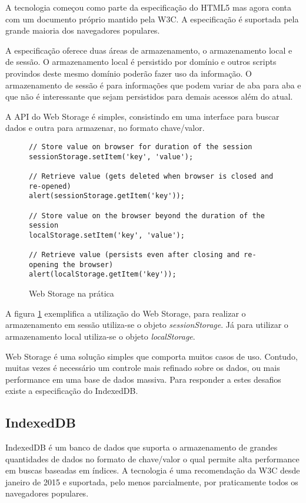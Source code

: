 A tecnologia começou como parte da especificação do HTML5 mas agora
conta com um documento próprio mantido pela W3C. A especificação é
suportada pela grande maioria dos navegadores populares.

A especificação oferece duas áreas de armazenamento, o armazenamento
local e de sessão. O armazenamento local é persistido por domínio
e outros scripts provindos deste mesmo domínio poderão fazer uso da
informação. O armazenamento de sessão é para informações que podem
variar de aba para aba e que não é interessante que sejam persistidos
para demais acessos além do atual.

A API do Web Storage é simples, consistindo em uma interface para
buscar dados e outra para armazenar, no formato chave/valor.

\begin{figure}[H]
\centering
\begin{verbatim}
// Store value on browser for duration of the session
sessionStorage.setItem('key', 'value');

// Retrieve value (gets deleted when browser is closed and re-opened)
alert(sessionStorage.getItem('key'));

// Store value on the browser beyond the duration of the session
localStorage.setItem('key', 'value');

// Retrieve value (persists even after closing and re-opening the browser)
alert(localStorage.getItem('key'));

\end{verbatim}
\caption{Web Storage na prática}
\label{fig:WebStorage}
\end{figure}

A figura \ref{fig:WebStorage} exemplifica a utilização do Web
Storage, para realizar o armazenamento em sessão utiliza-se o objeto
\textit{sessionStorage}. Já para utilizar o armazenamento local
utiliza-se o objeto \textit{localStorage}.

Web Storage é uma solução simples que comporta muitos casos de uso.
Contudo, muitas vezes é necessário um controle mais refinado
sobre os dados, ou mais performance em uma base de dados massiva. Para
responder a estes desafios existe a especificação do IndexedDB.

\subsection{IndexedDB}
IndexedDB é um banco de dados que suporta o armazenamento de grandes
quantidades de dados no formato de chave/valor o qual  permite alta
performance em buscas baseadas em índices. A tecnologia é uma recomendação
da W3C desde janeiro de 2015 e suportada, pelo menos parcialmente, por
praticamente todos os navegadores populares.

